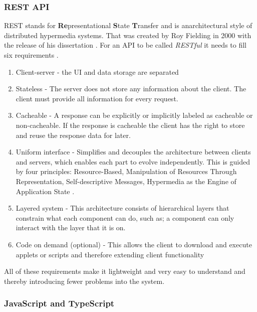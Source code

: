 \subsubsection{REST API}%
\label{sub:REST API}
REST stands for \textbf{Re}presentational \textbf{S}tate \textbf{T}ransfer and is anarchitectural style of distributed hypermedia systems. That was created by Roy Fielding in 2000 with the release of his dissertation \cite{fieldingFieldingDissertationCHAPTER}. For an API to be called \textit{RESTful} it needs to fill six requirements \cite{restfulapi.netWhatREST}.
\begin{enumerate}
  \item Client-server - the UI and data storage are separated
  \item Stateless -  The server does not store any information about the client. The client must provide all information for every request. 
  \item Cacheable - A response can be explicitly or implicitly labeled as cacheable or non-cacheable. If the response is cacheable the client has the right to store and reuse the response data for later.
  \item Uniform interface - Simplifies and decouples the architecture between clients and servers, which enables each part to evolve independently. This is guided by four principles: Resource-Based, Manipulation of Resources Through Representation, Self-descriptive Messages, Hypermedia as the Engine of Application State \cite{WhatREST}.
  \item Layered system -  This architecture consists of hierarchical layers that constrain what each component can do, such as; a component can only interact with the layer that it is on.
  \item  Code on demand (optional) - This allows the client to download and execute applets or scripts and therefore extending client functionality
\end{enumerate}


 
All of these requirements make it lightweight and very easy to understand and thereby introducing fewer problems into the system.  




\subsubsection{JavaScript and TypeScript}%
\label{ssub:JavaScript and TypeScript}

